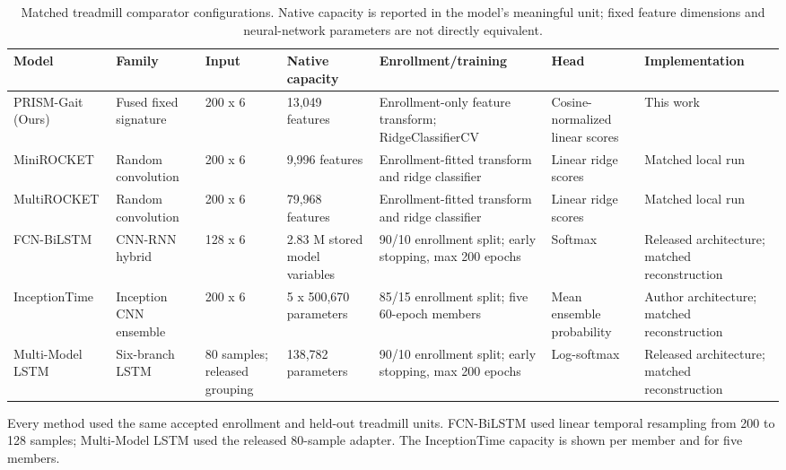 \begin{table}[t]
\caption{Matched treadmill comparator configurations. Native capacity is reported in the model's meaningful unit; fixed feature dimensions and neural-network parameters are not directly equivalent.}
\label{tab:comparator_configurations}
\centering
\small
\setlength{\tabcolsep}{3.5pt}
\renewcommand{\arraystretch}{1.16}
\begin{adjustbox}{max width=\textwidth}
\begin{tabular}{lllllll}
\toprule
Model & Family & Input & Native capacity & Enrollment/training & Head & Implementation \\
\midrule
PRISM-Gait (Ours) & Fused fixed signature & 200 x 6 & 13,049 features & Enrollment-only feature transform; RidgeClassifierCV & Cosine-normalized linear scores & This work \\
MiniROCKET & Random convolution & 200 x 6 & 9,996 features & Enrollment-fitted transform and ridge classifier & Linear ridge scores & Matched local run \\
MultiROCKET & Random convolution & 200 x 6 & 79,968 features & Enrollment-fitted transform and ridge classifier & Linear ridge scores & Matched local run \\
FCN-BiLSTM & CNN-RNN hybrid & 128 x 6 & 2.83 M stored model variables & 90/10 enrollment split; early stopping, max 200 epochs & Softmax & Released architecture; matched reconstruction \\
InceptionTime & Inception CNN ensemble & 200 x 6 & 5 x 500,670 parameters & 85/15 enrollment split; five 60-epoch members & Mean ensemble probability & Author architecture; matched reconstruction \\
Multi-Model LSTM & Six-branch LSTM & 80 samples; released grouping & 138,782 parameters & 90/10 enrollment split; early stopping, max 200 epochs & Log-softmax & Released architecture; matched reconstruction \\
\bottomrule
\end{tabular}
\end{adjustbox}
\vspace{2pt}
\parbox{0.98\textwidth}{\footnotesize Every method used the same accepted enrollment and held-out treadmill units. FCN-BiLSTM used linear temporal resampling from 200 to 128 samples; Multi-Model LSTM used the released 80-sample adapter. The InceptionTime capacity is shown per member and for five members.}
\end{table}
